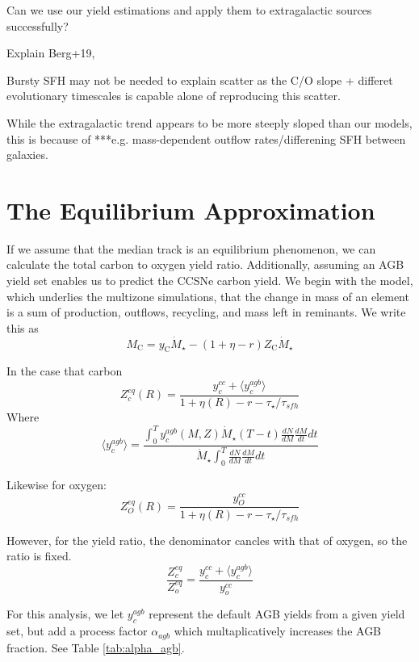 \documentclass[12pt,oneside]{report}
\begin{document}
Can we use our yield estimations and apply them to extragalactic sources successfully? 

Explain Berg+19,

Bursty SFH may not be needed to explain scatter as the C/O slope + differet evolutionary timescales is capable alone of reproducing this scatter.

While the extragalactic trend appears to be more steeply sloped than our models, this is because of ***e.g. mass-dependent outflow rates/differening SFH between galaxies. 

\chapter{The Equilibrium Approximation}\label{sec:equilibrium}
If we assume that the median track is an equilibrium phenomenon, we can calculate the total carbon to oxygen yield ratio. Additionally, assuming an AGB yield set enables us to predict the CCSNe carbon yield.  
We begin with the model, which underlies the multizone simulations, that the change in mass of an element is a sum of production, outflows, recycling, and mass left in reminants. We write this as
\begin{equation}
M_\text{C} = y_\text{C} \dot{M}_\star - (1 + \eta - r) Z_\text{C} \dot{M}_\star
\end{equation}

In the case that carbon
\begin{equation}
Z_c^{eq}(R) = \frac{y_c^{cc} + \langle y_c^{agb} \rangle }{1 + \eta(R) - r - \tau_\star / \tau_{sfh}}
\end{equation}Where
\begin{equation}
\langle y_c^{agb} \rangle = \frac{\int_0^T y_c^{agb}(M, Z) \dot{M}_\star(T - t) \frac{dN}{dM} \frac{dM}{dt} dt  }{ \dot{M}_\star \int_0^T \frac{dN}{dM} \frac{dM}{dt} dt}
\end{equation}

Likewise for oxygen:
\begin{equation}
Z_O^{eq}(R) = \frac{y_O^{cc}}{1 + \eta(R) - r - \tau_\star / \tau_{sfh}}
\end{equation}

However, for the yield ratio, the denominator cancles with that of oxygen, so the ratio is fixed.
\begin{equation}
\frac{Z_c^{eq}}{Z_o^{eq}} = \frac{y_c^{cc} + \langle y_c^{agb} \rangle }{y_o^{cc}}
\end{equation}

For this analysis, we let $y_c^{agb}$ represent the default AGB yields from a given yield set, but add a process factor $\alpha_{agb}$ which multaplicatively increases the AGB fraction. See Table \ref{tab:alpha_agb}.
\end{document}
